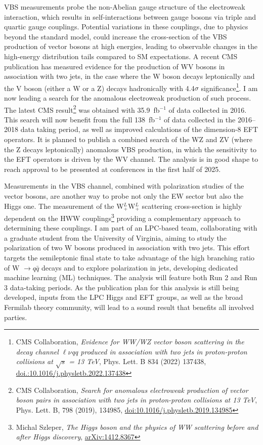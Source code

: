 {\begin{flushleft}
\vspace{\baselineskip}
VBS measurements probe the non-Abelian gauge structure of the electroweak interaction, which results in self-interactions between gauge bosons via triple and quartic gauge couplings. Potential variations in these couplings, due to physics beyond the standard model, could increase the cross-section of the VBS production of vector bosons at high energies, leading to observable changes in the high-energy distribution tails compared to SM expectations.
A recent CMS publication has measured evidence for the production of WV bosons in association with two jets, in the case where the W boson decays leptonically and the V boson (either a W or a Z) decays hadronically with 4.4$\sigma$ significance\footnote{CMS Collaboration, {\em Evidence for WW/WZ vector boson scattering in the decay channel $\ell\nu$qq produced in association with two jets in proton-proton collisions at $\sqrt{s}$ = 13 TeV}, Phys. Lett. B 834 (2022) 137438, \href{https://doi.org/10.1016/j.physletb.2022.137438}{doi.:10.1016/j.physletb.2022.137438}}. I am now leading a search for the anomalous electroweak production of such process. The latest CMS result\footnote{CMS Collaboration, {\em Search for anomalous electroweak production of vector boson pairs in association with two jets in proton-proton collisions at 13 TeV}, Phys. Lett. B, 798 (2019), 134985, \href{https://doi.org/10.1016/j.physletb.2019.134985}{doi:10.1016/j.physletb.2019.134985}} was obtained with 35.9~fb$^{-1}$ of data collected in 2016. This search will now benefit from the full 138~fb$^{-1}$ of data collected in the 2016--2018 data taking period, as well as improved calculations of the dimension-8 EFT operators. It is planned to publish a combined search of the WZ and ZV (where the Z decays leptonically) anomalous VBS production, in which the sensitivity to the EFT operators is driven by the WV channel. The analysis is in good shape to reach approval to be presented at conferences in the first half of 2025.

Measurements in the VBS channel, combined with polarization studies of the vector bosons, are another way to probe not only the EW sector but also the Higgs one.
The measurement of the  W$^L_+$W$^L_+$ scattering cross-section is highly dependent on the HWW couplings\footnote{Michal Szleper, {\em The Higgs boson and the physics of WW scattering before and after Higgs discovery}, \href{https://arxiv.org/pdf/1412.8367}{arXiv:1412.8367}} providing a complementary approach to determining these couplings. 
I am part of an LPC-based team, collaborating with a graduate student from the University of Virginia, aiming to study the polarization of two W bosons produced in association with two jets. This effort targets the semileptonic final state to take advantage of the high branching ratio of W $\to q\bar{q}$ decays and to explore polarization in jets, developing dedicated machine learning (ML) techniques. The analysis will feature both Run 2 and Run 3 data-taking periods. As the publication plan for this analysis is still being developed, inputs from the LPC Higgs and EFT groups, as well as the broad Fermilab theory community, will lead to a sound result that benefits all involved parties.
 

\end{flushleft}}

